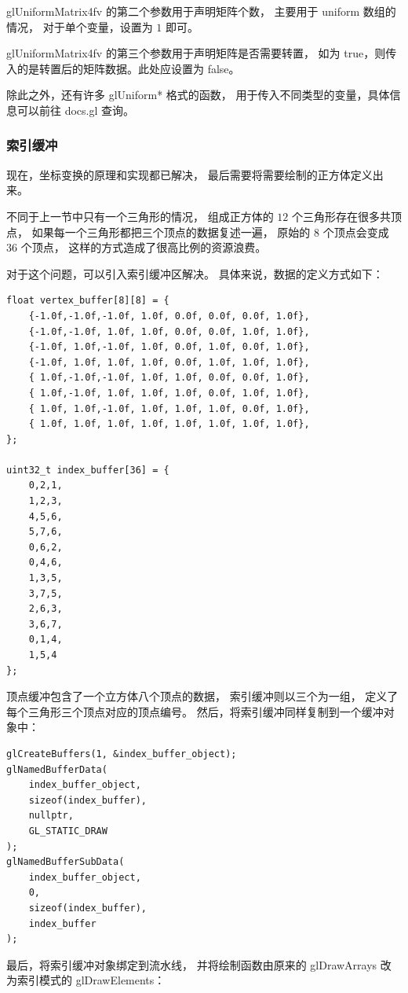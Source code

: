 \documentclass[fontset=windows]{ctexart}
\begin{document}
glUniformMatrix4fv 的第二个参数用于声明矩阵个数，
主要用于 uniform 数组的情况，
对于单个变量，设置为 $1$ 即可。

glUniformMatrix4fv 的第三个参数用于声明矩阵是否需要转置，
如为 true，则传入的是转置后的矩阵数据。此处应设置为 false。

除此之外，还有许多 glUniform* 格式的函数，
用于传入不同类型的变量，具体信息可以前往 docs.gl 查询。

\subsubsection{索引缓冲}

现在，坐标变换的原理和实现都已解决，
最后需要将需要绘制的正方体定义出来。

不同于上一节中只有一个三角形的情况，
组成正方体的 $12$ 个三角形存在很多共顶点，
如果每一个三角形都把三个顶点的数据复述一遍，
原始的 $8$ 个顶点会变成 $36$ 个顶点，
这样的方式造成了很高比例的资源浪费。

对于这个问题，可以引入索引缓冲区解决。
具体来说，数据的定义方式如下：

\begin{lstlisting}
float vertex_buffer[8][8] = {
    {-1.0f,-1.0f,-1.0f, 1.0f, 0.0f, 0.0f, 0.0f, 1.0f},
    {-1.0f,-1.0f, 1.0f, 1.0f, 0.0f, 0.0f, 1.0f, 1.0f},
    {-1.0f, 1.0f,-1.0f, 1.0f, 0.0f, 1.0f, 0.0f, 1.0f},
    {-1.0f, 1.0f, 1.0f, 1.0f, 0.0f, 1.0f, 1.0f, 1.0f},
    { 1.0f,-1.0f,-1.0f, 1.0f, 1.0f, 0.0f, 0.0f, 1.0f},
    { 1.0f,-1.0f, 1.0f, 1.0f, 1.0f, 0.0f, 1.0f, 1.0f},
    { 1.0f, 1.0f,-1.0f, 1.0f, 1.0f, 1.0f, 0.0f, 1.0f},
    { 1.0f, 1.0f, 1.0f, 1.0f, 1.0f, 1.0f, 1.0f, 1.0f},
};

uint32_t index_buffer[36] = {
    0,2,1,
    1,2,3,
    4,5,6,
    5,7,6,
    0,6,2,
    0,4,6,
    1,3,5,
    3,7,5,
    2,6,3,
    3,6,7,
    0,1,4,
    1,5,4
};
\end{lstlisting}

顶点缓冲包含了一个立方体八个顶点的数据，
索引缓冲则以三个为一组，
定义了每个三角形三个顶点对应的顶点编号。
然后，将索引缓冲同样复制到一个缓冲对象中：
\begin{lstlisting}
glCreateBuffers(1, &index_buffer_object);
glNamedBufferData(
    index_buffer_object, 
    sizeof(index_buffer), 
    nullptr, 
    GL_STATIC_DRAW
);
glNamedBufferSubData(
    index_buffer_object,
    0,
    sizeof(index_buffer),
    index_buffer
);
\end{lstlisting}

最后，将索引缓冲对象绑定到流水线，
并将绘制函数由原来的 glDrawArrays 改为索引模式的 glDrawElements：
\end{document}
